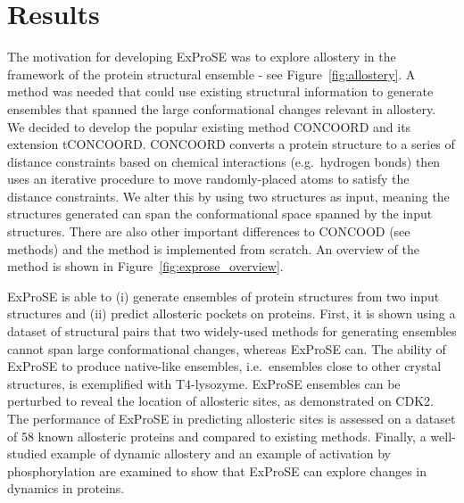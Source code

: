 \section{Results}
\label{sec:exprose_results}

The motivation for developing ExProSE was to explore allostery in the framework of the protein structural ensemble - see Figure~\ref{fig:allostery}.
A method was needed that could use existing structural information to generate ensembles that spanned the large conformational changes relevant in allostery.
We decided to develop the popular existing method CONCOORD and its extension tCONCOORD.
CONCOORD converts a protein structure to a series of distance constraints based on chemical interactions (e.g.\ hydrogen bonds) then uses an iterative procedure to move randomly-placed atoms to satisfy the distance constraints.
We alter this by using two structures as input, meaning the structures generated can span the conformational space spanned by the input structures.
There are also other important differences to CONCOOD (see methods) and the method is implemented from scratch.
An overview of the method is shown in Figure~\ref{fig:exprose_overview}.

ExProSE is able to (i) generate ensembles of protein structures from two input structures and (ii) predict allosteric pockets on proteins.
First, it is shown using a dataset of structural pairs that two widely-used methods for generating ensembles cannot span large conformational changes, whereas ExProSE can.
The ability of ExProSE to produce native-like ensembles, i.e.\ ensembles close to other crystal structures, is exemplified with T4-lysozyme.
ExProSE ensembles can be perturbed to reveal the location of allosteric sites, as demonstrated on CDK2.
The performance of ExProSE in predicting allosteric sites is assessed on a dataset of 58 known allosteric proteins and compared to existing methods.
Finally, a well-studied example of dynamic allostery and an example of activation by phosphorylation are examined to show that ExProSE can explore changes in dynamics in proteins.


